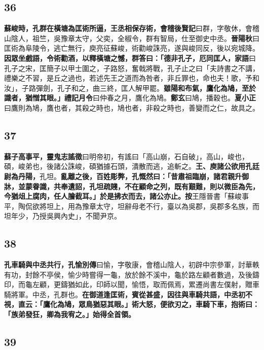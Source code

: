 \subsection*{36}

\textbf{蘇峻時，孔群在橫塘為匡術所逼，王丞相保存術，}{\footnotesize \textbf{會稽後賢記}曰群，字敬休，會稽山陰人，祖竺，吳豫章太守，父奕，全椒令，群有智局，仕至御史中丞。\textbf{晉陽秋}曰匡術為阜陵令，逃亡無行，庾亮征蘇峻，術勸峻誅亮，遂與峻同反，後以宛城降。}\textbf{因眾坐戲語，令術勸酒，以釋橫塘之憾，群答曰：「德非孔子，厄同匡人，}{\footnotesize \textbf{家語}曰孔子之宋，匡簡子以甲士圍之，子路怒，奮戟將戰，孔子止之曰「夫詩書之不講，禮樂之不習，是丘之過也，若述先王之道而為咎者，非丘罪也，命也夫！歌，予和汝」，子路彈劍，孔子和之，曲三終，匡人解甲罷。}\textbf{雖陽和布氣，鷹化為鳩，至於識者，猶憎其眼。」}{\footnotesize \textbf{禮記月令}曰仲春之月，鷹化為鳩。\textbf{鄭玄}曰鳩，播穀也。\textbf{夏小正}曰鷹則為鳩，鷹也者，其殺之時也，鳩也者，非殺之時也，善變而之仁，故具之。}

\subsection*{37}

\textbf{蘇子高事平，}{\footnotesize \textbf{靈鬼志謠徵}曰明帝初，有謠曰「高山崩，石自破」，高山，峻也，碩，峻弟也，後諸公誅峻，碩猶據石頭，潰散而逃，追斬之。}\textbf{王、庾諸公欲用孔廷尉為丹陽，}{\footnotesize 孔坦。}\textbf{亂離之後，百姓彫弊，孔慨然曰：「昔肅祖臨崩，諸君親升御牀，並蒙眷識，共奉遺詔，孔坦疏賤，不在顧命之列，既有艱難，則以微臣為先，今猶俎上腐肉，任人膾截耳。」於是拂衣而去，諸公亦止。}{\footnotesize \textbf{按}王隱晉書「蘇峻事平，陶侃欲將坦上，用為豫章太守，坦辭母老不行，臺以為吳郡，吳郡多名族，而坦年少，乃授吳興內史」，不聞尹京。}

\subsection*{38}

\textbf{孔車騎與中丞共行，}{\footnotesize \textbf{孔愉別傳}曰愉，字敬康，會稽山陰人，初辟中宗參軍，討華軼有功，封餘不亭侯，愉少時嘗得一龜，放於餘不溪中，龜於路左顧者數過，及後鑄印，而龜左顧，更鑄猶如此，印師以聞，愉悟，取而佩焉，累遷尚書左僕射，贈車騎將軍。中丞，孔群也。}\textbf{在御道逢匡術，賓從甚盛，因往與車騎共語，中丞初不視，直云：「鷹化為鳩，眾鳥猶惡其眼。」術大怒，便欲刃之，車騎下車，抱術曰：「族弟發狂，卿為我宥之。」始得全首領。}

\subsection*{39}

